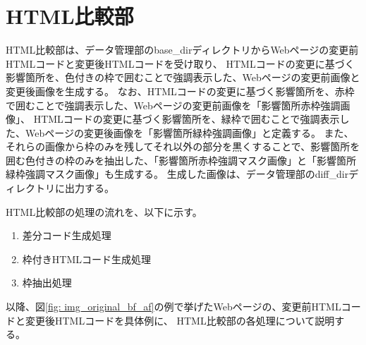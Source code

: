 \section{HTML比較部}\label{sec:Affected_area_extraction}
HTML比較部は、データ管理部のbase\_dirディレクトリからWebページの変更前HTMLコードと変更後HTMLコードを受け取り、
HTMLコードの変更に基づく影響箇所を、色付きの枠で囲むことで強調表示した、Webページの変更前画像と変更後画像を生成する。
なお、HTMLコードの変更に基づく影響箇所を、赤枠で囲むことで強調表示した、Webページの変更前画像を「影響箇所赤枠強調画像」、
HTMLコードの変更に基づく影響箇所を、緑枠で囲むことで強調表示した、Webページの変更後画像を「影響箇所緑枠強調画像」と定義する。
また、それらの画像から枠のみを残してそれ以外の部分を黒くすることで、影響箇所を囲む色付きの枠のみを抽出した、「影響箇所赤枠強調マスク画像」と「影響箇所緑枠強調マスク画像」も生成する。
生成した画像は、データ管理部のdiff\_dirディレクトリに出力する。
\par
HTML比較部の処理の流れを、以下に示す。
\begin{enumerate}
    \item 差分コード生成処理
    \item 枠付きHTMLコード生成処理
    \item 枠抽出処理
\end{enumerate}
以降、図\ref{fig: img_original_bf_af}の例で挙げたWebページの、変更前HTMLコードと変更後HTMLコードを具体例に、
HTML比較部の各処理について説明する。

